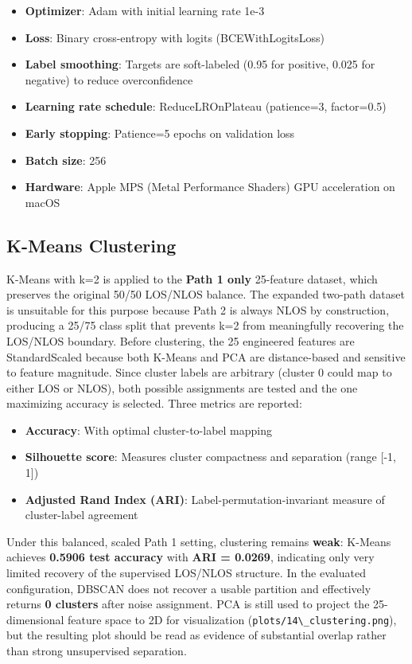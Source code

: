 \documentclass[12pt,a4paper]{article}
\newcommand{\passthrough}[1]{#1}
\providecommand{\passthrough}[1]{#1}
\providecommand{\tightlist}{%
  \setlength{\itemsep}{0pt}\setlength{\parskip}{0pt}}
\begin{document}
\begin{itemize}
\tightlist
\item
  \textbf{Optimizer}: Adam with initial learning rate 1e-3
\item
  \textbf{Loss}: Binary cross-entropy with logits (BCEWithLogitsLoss)
\item
  \textbf{Label smoothing}: Targets are soft-labeled (0.95 for positive,
  0.025 for negative) to reduce overconfidence
\item
  \textbf{Learning rate schedule}: ReduceLROnPlateau (patience=3,
  factor=0.5)
\item
  \textbf{Early stopping}: Patience=5 epochs on validation loss
\item
  \textbf{Batch size}: 256
\item
  \textbf{Hardware}: Apple MPS (Metal Performance Shaders) GPU
  acceleration on macOS
\end{itemize}

\subsection{K-Means Clustering}\label{k-means-clustering}

K-Means with k=2 is applied to the \textbf{Path 1 only} 25-feature
dataset, which preserves the original 50/50 LOS/NLOS balance. The
expanded two-path dataset is unsuitable for this purpose because Path 2
is always NLOS by construction, producing a 25/75 class split that
prevents k=2 from meaningfully recovering the LOS/NLOS boundary. Before
clustering, the 25 engineered features are StandardScaled because both
K-Means and PCA are distance-based and sensitive to feature magnitude.
Since cluster labels are arbitrary (cluster 0 could map to either LOS or
NLOS), both possible assignments are tested and the one maximizing
accuracy is selected. Three metrics are reported:

\begin{itemize}
\tightlist
\item
  \textbf{Accuracy}: With optimal cluster-to-label mapping
\item
  \textbf{Silhouette score}: Measures cluster compactness and separation
  (range {[}-1, 1{]})
\item
  \textbf{Adjusted Rand Index (ARI)}: Label-permutation-invariant
  measure of cluster-label agreement
\end{itemize}

Under this balanced, scaled Path 1 setting, clustering remains
\textbf{weak}: K-Means achieves \textbf{0.5906 test accuracy} with
\textbf{ARI = 0.0269}, indicating only very limited recovery of the
supervised LOS/NLOS structure. In the evaluated configuration, DBSCAN
does not recover a usable partition and effectively returns \textbf{0
clusters} after noise assignment. PCA is still used to project the
25-dimensional feature space to 2D for visualization
(\passthrough{\lstinline!plots/14\_clustering.png!}), but the resulting
plot should be read as evidence of substantial overlap rather than
strong unsupervised separation.
\end{document}
